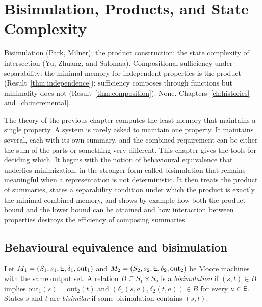 \chapter{Bisimulation, Products, and State Complexity}\label{ch:products}
{Bisimulation (Park, Milner); the product construction; the state complexity of intersection (Yu, Zhuang, and Salomaa).}
{Compositional sufficiency under separability: the minimal memory for independent properties is the product (Result~\ref{thm:independence}); sufficiency composes through functions but minimality does not (Result~\ref{thm:composition}).}
{None.}
{Chapters~\ref{ch:histories} and~\ref{ch:incremental}.}

The theory of the previous chapter computes the least memory that maintains a single property. A system is rarely asked to maintain one property. It maintains several, each with its own summary, and the combined requirement can be either the sum of the parts or something very different. This chapter gives the tools for deciding which. It begins with the notion of behavioural equivalence that underlies minimization, in the stronger form called bisimulation that remains meaningful when a representation is not deterministic. It then treats the product of summaries, states a separability condition under which the product is exactly the minimal combined memory, and shows by example how both the product bound and the lower bound can be attained and how interaction between properties destroys the efficiency of composing summaries.

\section{Behavioural equivalence and bisimulation}

\begin{definition}\label{def:bisim}
Let $M_1=(S_1,s_1,\mathsf{E},\delta_1,\mathrm{out}_1)$ and $M_2=(S_2,s_2,\mathsf{E},\delta_2,\mathrm{out}_2)$ be Moore machines with the same output set. A relation $B\subseteq S_1\times S_2$ is a \emph{bisimulation} if $(s,t)\in B$ implies $\mathrm{out}_1(s)=\mathrm{out}_2(t)$ and $(\delta_1(s,a),\delta_2(t,a))\in B$ for every $a\in\mathsf{E}$. States $s$ and $t$ are \emph{bisimilar} if some bisimulation contains $(s,t)$.
\end{definition}

